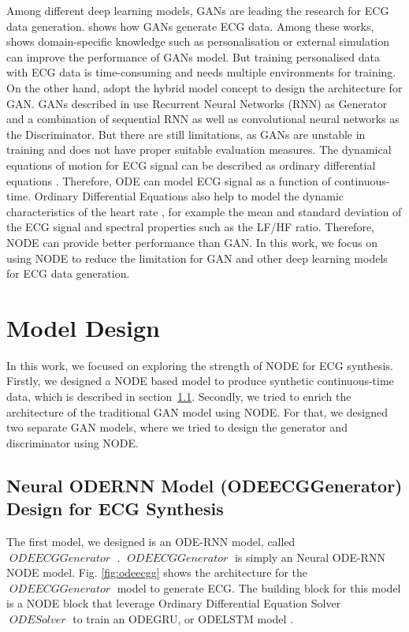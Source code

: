 \documentclass{article}
\DeclareMathOperator{\ODESOLVER}{\textit{ODESolver}}
\DeclareMathOperator{\ODEECGGenerator}{\textit{ODEECGGenerator}}
\begin{document}
Among different deep learning models, GANs are leading the research for ECG data generation. \citep{brophy2020synthesis,delaney2019synthesis, golany2020simgans, golany2019pgans} shows how GANs generate ECG data. Among these works, \citep{golany2020simgans, golany2019pgans} shows domain-specific knowledge such as personalisation or external simulation can improve the performance of GANs model. But training personalised data with ECG data is time-consuming and needs multiple environments for training. On the other hand, \citep{brophy2020synthesis,delaney2019synthesis} adopt the hybrid model concept to design the architecture for GAN. GANs described in \citep{brophy2020synthesis,delaney2019synthesis} use Recurrent Neural Networks (RNN) as Generator and a combination of sequential RNN as well as convolutional neural networks as the Discriminator. But there are still limitations, as GANs are unstable in training and does not have proper suitable evaluation measures. The dynamical equations of motion for ECG signal can be described as ordinary differential equations \cite{mcsharry2003dynamical}. Therefore, ODE can model ECG signal as a function of continuous-time. Ordinary Differential Equations also help to model the dynamic characteristics of the heart rate , for example the mean and standard deviation of the ECG signal and spectral properties such as the LF/HF ratio. Therefore, NODE can provide better performance than GAN.  In this work, we focus on using NODE to reduce the limitation for GAN and other deep learning models for ECG data generation.


\section{Model Design}
In this work, we focused on exploring the strength of NODE for ECG synthesis. Firstly, we designed a NODE based model to produce synthetic continuous-time data, which is described in section~\ref{sec:modela}. Secondly, we tried to enrich the architecture of the traditional GAN model using NODE. For that, we designed two separate GAN models, where we tried to design the generator and discriminator using NODE. 

\subsection{Neural ODERNN Model (ODEECGGenerator) Design for ECG Synthesis}
\label{sec:modela}
The first model, we designed is an ODE-RNN \cite{habiba2020neural} model, called $\ODEECGGenerator$ . $\ODEECGGenerator$ is simply an Neural ODE-RNN \cite{habiba2020neural} NODE model.  Fig. \ref{fig:odeecgg} shows the architecture for the $\ODEECGGenerator$  model to generate ECG. The building block for this model is a NODE block that leverage Ordinary Differential Equation Solver $\ODESOLVER$ to train an ODEGRU, or ODELSTM model \cite{habiba2020neural}.
 
\end{document}
